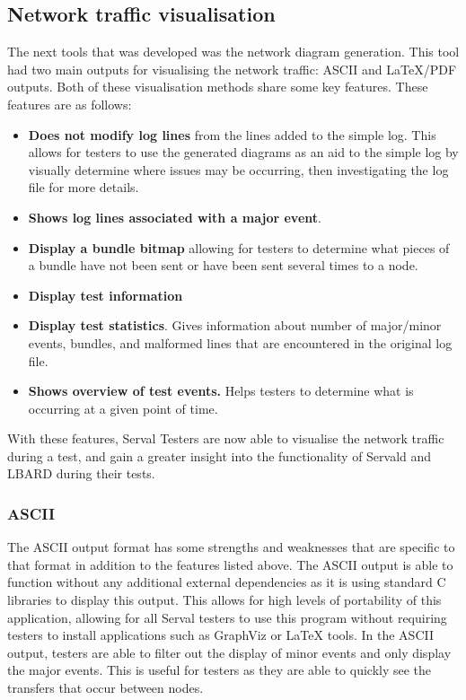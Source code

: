 \subsection{Network traffic visualisation}
The next tools that was developed was the network diagram generation.
This tool had two main outputs for visualising the network traffic: ASCII and LaTeX/PDF outputs.
Both of these visualisation methods share some key features.
These features are as follows:
\begin{itemize}
    \item \textbf{Does not modify log lines} from the lines added to the simple log. 
    This allows for testers to use the generated diagrams as an aid to the simple log by visually determine where issues may be occurring, then investigating the log file for more details. 
    \item \textbf{Shows log lines associated with a major event}. 
    \item \textbf{Display a bundle bitmap} allowing for testers to determine what pieces of a bundle have not been sent or have been sent several times to a node.
    \item \textbf{Display test information}
    \item \textbf{Display test statistics}. 
    Gives information about number of major/minor events, bundles, and malformed lines that are encountered in the original log file.
    \item \textbf{Shows overview of test events.}  
    Helps testers to determine what is occurring at a given point of time.
\end{itemize}
With these features, Serval Testers are now able to visualise the network traffic during a test, and gain a greater insight into the functionality of Servald and LBARD during their tests.

\subsubsection{ASCII}
The ASCII output format has some strengths and weaknesses that are specific to that format in addition to the features listed above.
The ASCII output is able to function without any additional external dependencies as it is using standard C libraries to display this output.
This allows for high levels of portability of this application, allowing for all Serval testers to use this program without requiring testers to install applications such as GraphViz or LaTeX tools.
In the ASCII output, testers are able to filter out the display of minor events and only display the major events.
This is useful for testers as they are able to quickly see the transfers that occur between nodes.

